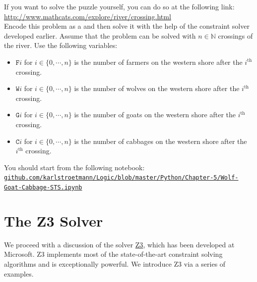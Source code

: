 If you want to solve the puzzle yourself, you can do so at the following link:
\\[0.2cm]
\hspace*{1.3cm}
\href{http://www.mathcats.com/explore/river/crossing.html}{http://www.mathcats.com/explore/river/crossing.html}
\\[0.2cm]
Encode this problem as a  and then solve it with the help
of the constraint solver developed earlier.  Assume that the
problem can be solved with $n\in\mathbb{N}$ crossings of the river.  Use the following
variables:
\begin{itemize}
\item $\texttt{F}i$ for $i\in\{0,\cdots,n\}$ is the number of farmers on the western shore after the 
      $i^{\textrm{th}}$ crossing.
\item $\texttt{W}i$ for $i\in\{0,\cdots,n\}$ is the number of wolves on the western shore after the 
      $i^{\textrm{th}}$ crossing.
\item $\texttt{G}i$ for $i\in\{0,\cdots,n\}$ is the number of goats on the western shore after the 
      $i^{\textrm{th}}$ crossing.
\item $\texttt{C}i$ for $i\in\{0,\cdots,n\}$ is the number of cabbages on the western shore after the 
      $i^{\textrm{th}}$ crossing.
\end{itemize}
You should start from the following notebook:
\\[0.2cm]
\href{https://github.com/karlstroetmann/Logic/blob/master/Python/Chapter-5/Wolf-Goat-Cabbage-STS.ipynb}{\small\texttt{github.com/karlstroetmann/Logic/blob/master/Python/Chapter-5/Wolf-Goat-Cabbage-STS.ipynb}}
\eox

\section{The Z3 Solver}
We proceed with a discussion of the solver
\href{https://www.microsoft.com/en-us/research/project/z3-3/}{Z3}, which has been developed
at Microsoft.  Z3 implements most of the state-of-the-art constraint solving algorithms
and is exceptionally powerful.  We introduce Z3 via a series of examples.


